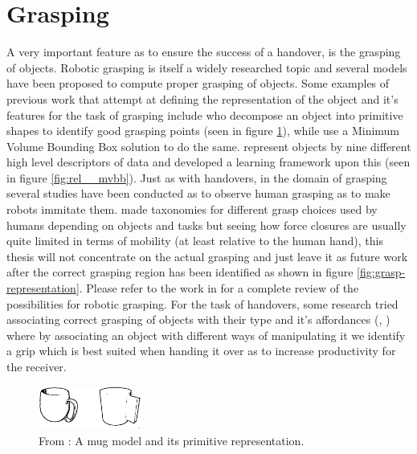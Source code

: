 \section{Grasping}
A very important feature as to ensure the success of a handover, is the grasping of objects. Robotic grasping is itself a widely researched topic and several models have been proposed to compute proper grasping of objects. Some examples of previous work that attempt at defining the representation of the object and it's features for the task of grasping include \textcite{Miller2003} who decompose an object into primitive shapes to identify good grasping points (seen in figure \ref{fig:rel__shape-primitives}), while \textcite{Huebner2008} use a Minimum Volume Bounding Box solution to do the same. \textcite{Morales} represent objects by nine different high level descriptors of data and developed a learning framework upon this (seen in figure \ref{fig:rel__mvbb}). Just as with handovers, in the domain of grasping several studies have been conducted as to observe human grasping as to make robots immitate them. \parencite{Cutkosky1990} \parencite{Feix2009} \parencite{Kang1993} made taxonomies for different grasp choices used by humans depending on objects and tasks but seeing how force closures are usually quite limited in terms of mobility (at least relative to the human hand), this thesis will not concentrate on the actual grasping and just leave it as future work after the correct grasping region has been identified as shown in figure \ref{fig:grasp-representation}. Please refer to the work in \parencite{Sahbani2012} for a complete review of the possibilities for robotic grasping. For the task of handovers, some research tried associating correct grasping of objects with their type and it's affordances (\parencite{Song2015}, \parencite{Chan2014}) where by associating an object with different ways of manipulating it we identify a grip which is best suited when handing it over as to increase productivity for the receiver.

\begin{figure}
	\centering
	\includegraphics[width=0.3\textwidth]{img/related-work/shape-primitives.png}
	\caption{From \parencite{Miller2003}: A mug model and its primitive representation.}
	\label{fig:rel__shape-primitives}
\end{figure}

